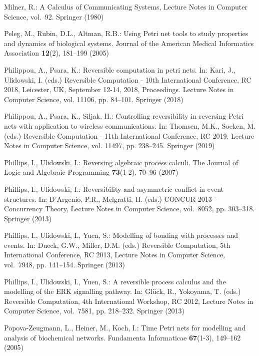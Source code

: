 \documentclass[runningheads]{llncs}
\begin{document}
\begin{thebibliography}{10}
Milner, R.: A Calculus of Communicating Systems, Lecture Notes in Computer
  Science, vol.~92. Springer (1980)

Peleg, M., Rubin, D.L., Altman, R.B.: Using {P}etri net tools to study
  properties and dynamics of biological systems. {Journal of the American
  Medical Informatics Association}  \textbf{12}(2),  181--199 (2005)

Philippou, A., Psara, K.: Reversible computation in petri nets. In: Kari, J.,
  Ulidowski, I. (eds.) Reversible Computation - 10th International Conference,
  {RC} 2018, Leicester, UK, September 12-14, 2018, Proceedings. Lecture Notes
  in Computer Science, vol. 11106, pp. 84--101. Springer (2018)

Philippou, A., Psara, K., Siljak, H.: Controlling reversibility in reversing
  {P}etri nets with application to wireless communications. In: Thomsen, M.K.,
  Soeken, M. (eds.) Reversible Computation - 11th International Conference,
  {RC} 2019. Lecture Notes in Computer Science, vol. 11497, pp. 238--245.
  Springer (2019)

Phillips, I., Ulidowski, I.: Reversing algebraic process calculi. The Journal
  of Logic and Algebraic Programming  \textbf{73}(1-2),  70--96 (2007)

Phillips, I., Ulidowski, I.: Reversibility and asymmetric conflict in event
  structures. In: D'Argenio, P.R., Melgratti, H. (eds.) CONCUR 2013 -
  Concurrency Theory, Lecture Notes in Computer Science, vol.~8052, pp.
  303--318. Springer (2013)

Phillips, I., Ulidowski, I., Yuen, S.: Modelling of bonding with processes and
  events. In: Dueck, G.W., Miller, D.M. (eds.) Reversible Computation, 5th
  International Conference, RC 2013, Lecture Notes in Computer Science,
  vol.~7948, pp. 141--154. Springer (2013)

Phillips, I., Ulidowski, I., Yuen, S.: A reversible process calculus and the
  modelling of the {ERK} signalling pathway. In: Gl{\"u}ck, R., Yokoyama, T.
  (eds.) Reversible Computation, 4th International Workshop, RC 2012, Lecture
  Notes in Computer Science, vol.~7581, pp. 218--232. Springer (2013)

Popova{-}Zeugmann, L., Heiner, M., Koch, I.: Time {P}etri nets for modelling
  and analysis of biochemical networks. Fundamenta Informaticae
  \textbf{67}(1-3),  149--162 (2005)


\end{thebibliography}
\end{document}
